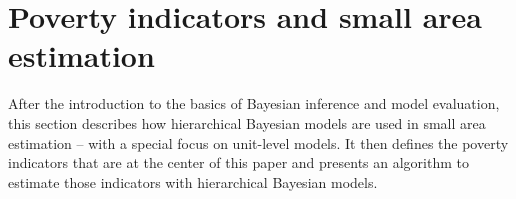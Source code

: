 \section{Poverty indicators and small area estimation}

After the introduction to the basics of Bayesian inference and model evaluation, this section describes how hierarchical Bayesian models are used in small area estimation – with a special focus on unit-level models.
It then defines the poverty indicators that are at the center of this paper and presents an algorithm to estimate those indicators with hierarchical Bayesian models.


%


